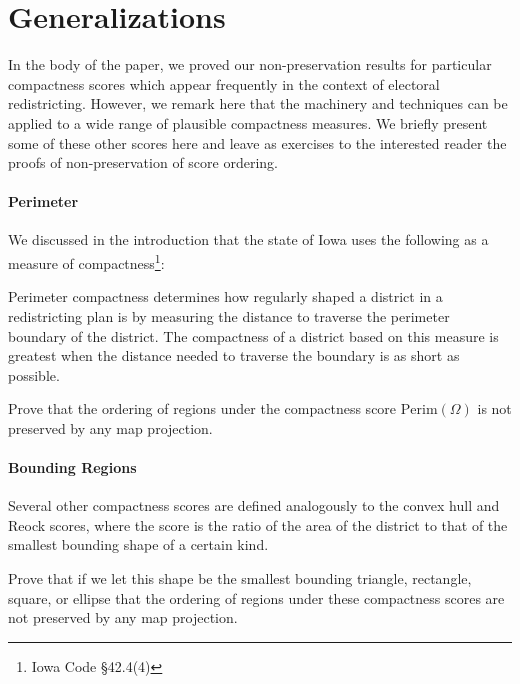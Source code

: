 \section{Generalizations}

In the body of the paper, we proved our non-preservation results for particular compactness scores which appear frequently in the context of electoral redistricting.  However, we remark here that the machinery and techniques can be applied to a wide range of plausible compactness measures.  We briefly present some of these other scores here and leave as exercises to the interested reader the proofs of non-preservation of score ordering.

\paragraph{Perimeter} 

We discussed in the introduction that the state of Iowa uses the following as a measure of compactness\footnote{Iowa Code \S42.4(4)}:

\begin{displayquote}
	
	Perimeter compactness determines how regularly shaped a district in a
	redistricting plan is by measuring the distance to traverse the perimeter boundary of
	the district. The compactness of a district based on this measure is greatest when
	the distance needed to traverse the boundary is as short as possible. 
	
	\end{displayquote}

Prove that the ordering of regions  under the compactness score $\mathrm{Perim}(\Omega)$ is not preserved by any map projection.




\paragraph{Bounding Regions}

Several other compactness scores are defined analogously to the convex hull and Reock scores, where the score is the ratio of the area of the district to that of the smallest bounding shape of a certain kind.

Prove that if we let this shape be the smallest bounding triangle, rectangle, square, or ellipse that the ordering of regions under these compactness scores are not preserved by any map projection.

